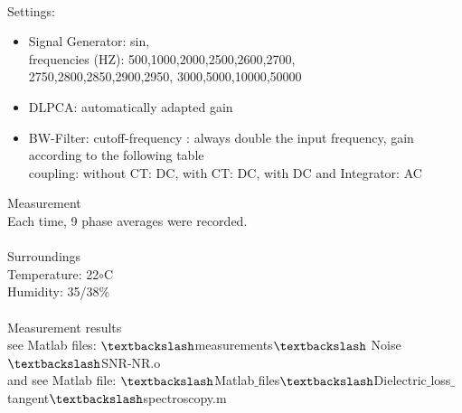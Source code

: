 \\
{\Large Settings:} \newline
\begin{itemize}
\item Signal Generator:  sin,\\
frequencies (HZ): 500,1000,2000,2500,2600,2700,\\
2750,2800,2850,2900,2950, 3000,5000,10000,50000
\item DLPCA:  automatically adapted gain
\item BW-Filter:  cutoff-frequency : always double the input frequency, gain according to the following table\\ coupling: without CT: DC, with CT: DC, with DC and Integrator: AC
\end{itemize}
{\Large Measurement} \\
Each time, 9 phase averages were recorded. \\
\\
{\Large Surroundings} \\
Temperature:  22$\circ$C\\
Humidity: 35/38$\%$\\
\\
{\Large Measurement results}\\
see Matlab files: $\textbackslash$measurements$\textbackslash$ Noise$\textbackslash$SNR-NR.o\\
and see Matlab file: $\textbackslash$Matlab$\_$files$\textbackslash$Dielectric$\_$loss$\_$tangent$\textbackslash$spectroscopy.m